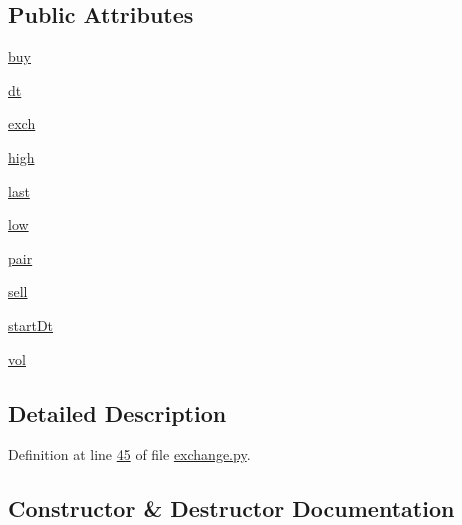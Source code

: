 \subsection*{Public Attributes}
\begin{DoxyCompactItemize}
\item 
\hyperlink{classexchange_1_1_ticker_a2ca48c3fa9aba92241392a05bef39324}{buy}
\item 
\hyperlink{classexchange_1_1_ticker_a45e3162d9956cee797f21d93c44c6baf}{dt}
\item 
\hyperlink{classexchange_1_1_ticker_a33f33fe9a12da3ce52938afdc577c061}{exch}
\item 
\hyperlink{classexchange_1_1_ticker_aace381ca15468df6a40e8d86b7710a7f}{high}
\item 
\hyperlink{classexchange_1_1_ticker_add7c2d95fa790dcdffddae2e584ce5f5}{last}
\item 
\hyperlink{classexchange_1_1_ticker_a1c1f26a47a82fc799fcebf158e104405}{low}
\item 
\hyperlink{classexchange_1_1_ticker_a382f9199d13a7b5929a26065fad4e491}{pair}
\item 
\hyperlink{classexchange_1_1_ticker_a5ba9e257d2ed28f02528a37d9ebd793e}{sell}
\item 
\hyperlink{classexchange_1_1_ticker_a543696a29fac37ff29a3f6ef25cccd12}{start\+Dt}
\item 
\hyperlink{classexchange_1_1_ticker_a24c0dd396aebc54c06e429a68c964ea3}{vol}
\end{DoxyCompactItemize}


\subsection{Detailed Description}


Definition at line \hyperlink{exchange_8py_source_l00045}{45} of file \hyperlink{exchange_8py_source}{exchange.\+py}.



\subsection{Constructor \& Destructor Documentation}
\mbox{\label{classexchange_1_1_ticker_a4a8c99ada461a4aeb960c14020a47736}} 
